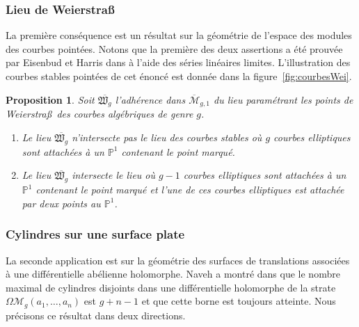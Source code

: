 \documentclass[11pt]{article}
\numberwithin{equation}{section}\renewcommand{\proofname}{Démonstration}
\let\mathcal\mathscr
\newenvironment{enumeratei}
{\bgroup\def\theenumi{\roman{enumi}}\def\theenumii{\arabic{enumii}}\begin{enumerate}}
{\end{enumerate}\egroup}
\newcommand{\PP}{{\mathbb{P}}}
\newcommand{\barmoduli}[1][g]{{\overline{\mathcal M}}_{\!#1}}
\newcommand{\omoduli}[1][g]{{\Omega\mathcal M}_{\!#1}}
\newcommand{\Weierstrass}{Weierstra\ss{}}
\newtheorem{prop}[thm]{Proposition}
\theoremstyle{definition}
\begin{document}
\subsubsection*{Lieu de \Weierstrass}
La première conséquence est un résultat sur la géométrie de l'espace des modules des courbes pointées. Notons que la première des deux assertions a été prouvée par Eisenbud et Harris dans \cite[Th.\,3.1]{eiha} à l'aide des séries linéaires limites. L'illustration des courbes stables pointées de cet énoncé est donnée dans la figure~\ref{fig:courbesWei}.
\begin{prop}\label{prop:limWei}
Soit $\overline{\mathfrak{W}_{g}}$ l'adhérence dans $\barmoduli[g,1]$ du lieu paramétrant les points de Weierstra\ss{}~des courbes algébriques de genre $g$.
\begin{enumeratei}
\item\label{prop:limWeii}
Le lieu $\overline{\mathfrak{W}_{g}}$ n’intersecte pas le lieu des courbes stables où $g$ courbes elliptiques sont attachées à un $\PP^{1}$ contenant le point marqué.
\item\label{prop:limWeiii}
Le lieu $\overline{\mathfrak{W}_{g}}$ intersecte le lieu où $g-1$ courbes elliptiques sont attachées à un~$\PP^{1}$ contenant le point marqué et l'une de ces courbes elliptiques est attachée par deux points au $\PP^{1}$.
\end{enumeratei}
\end{prop}

\subsubsection*{Cylindres sur une surface plate}
La seconde application est sur la géométrie des surfaces de translations associées à une différentielle abélienne holomorphe. Naveh a montré dans \cite{Na} que le nombre maximal de cylindres disjoints dans une différentielle holomorphe de la strate $\omoduli(a_{1},\dots,a_{n})$ est $g+n-1$ et que cette borne est toujours atteinte. Nous précisons ce résultat dans deux directions.
\end{document}
